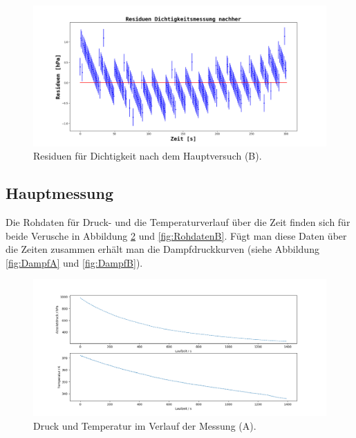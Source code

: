 \documentclass[12pt,a4paper]{article}
\begin{document}
\begin{figure}
\includegraphics[width=\linewidth]{Bilder/Residuen_Dichtigkeit_nachher_B}
\caption{Residuen für Dichtigkeit nach dem Hauptversuch (B).}
\label{fig:ResiduenDichtigkeitNachherB}
\end{figure}



\subsection{Hauptmessung}


Die Rohdaten für Druck- und die Temperaturverlauf über die Zeit finden sich für beide Verusche in Abbildung \ref{fig:RohdatenA} und \ref{fig:RohdatenB}. Fügt man diese Daten über die Zeiten zusammen erhält man die Dampfdruckkurven (siehe Abbildung \ref{fig:DampfA} und \ref{fig:DampfB}).\\


\begin{figure}[H]
\includegraphics[width=\linewidth]{Bilder/Rohdaten_HauptmessungA.png}
\caption[Rohdaten A]{Druck und Temperatur im Verlauf der Messung (A).}
\label{fig:RohdatenA}
\end{figure}
\end{document}
